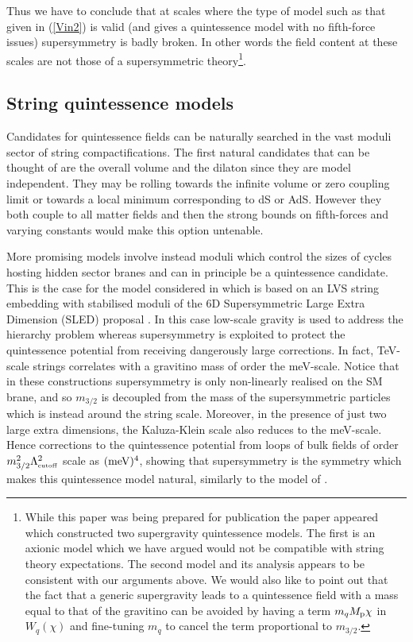 \documentclass[11pt,a4paper]{article}
\def\cutoff{{\scriptscriptstyle {\rm cutoff}}}
\begin{document}
\begin{itemize}
Thus we have to conclude that at scales where the type of model such as that given in (\ref{Vin2}) is valid (and gives a quintessence model with no fifth-force issues) supersymmetry is badly broken. In other words the field content at these scales are not those of a supersymmetric theory\footnote{While this paper was being prepared for publication the paper \cite{Chiang:2018jdg} appeared which constructed two supergravity quintessence models. The first is an axionic model which we have argued would not be compatible with string theory expectations. The second model and its analysis appears to be consistent with our arguments above. We would also like to point out that the fact that a generic supergravity leads to a quintessence field with a mass equal to that of the gravitino can be avoided by having a term $m_q M_{\rm p} \chi$ in $W_q(\chi)$ and fine-tuning $m_q$ to cancel the term proportional to $m_{3/2}$.}.



\subsection{String quintessence models}
\label{sec:StringQuintessenceModels}

Candidates for quintessence fields can be naturally searched in the vast moduli sector of string compactifications. The first natural candidates that can be thought of are the overall volume and the dilaton since they are model independent. They may be rolling towards the infinite volume or zero coupling limit or towards a local minimum corresponding to dS or AdS. However they both couple to all matter fields and then the strong bounds on fifth-forces and varying constants would make this option untenable.

More promising models involve instead moduli which control the sizes of cycles hosting hidden sector branes and can in principle be a quintessence candidate. This is the case for the model considered in \cite{Cicoli:2012tz} which is based on an LVS string embedding with stabilised moduli \cite{Cicoli:2011yy} of the 6D Supersymmetric Large Extra Dimension (SLED) proposal \cite{Aghababaie:2003wz}. In this case low-scale gravity is used to address the hierarchy problem whereas supersymmetry is exploited to protect the quintessence potential from receiving dangerously large corrections. In fact, TeV-scale strings correlates with a gravitino mass of order the meV-scale. Notice that in these constructions supersymmetry is only non-linearly realised on the SM brane, and so $m_{3/2}$ is decoupled from the mass of the supersymmetric particles which is instead around the string scale. Moreover, in the presence of just two large extra dimensions, the Kaluza-Klein scale also reduces to the meV-scale. Hence corrections to the quintessence potential from loops of bulk fields of order $m_{3/2}^2 \Lambda_\cutoff^2$ scale as $({\rm meV})^4$, showing that supersymmetry is the symmetry which makes this quintessence model natural, similarly to the model of \cite{Albrecht:2001xt}. 


\end{itemize}
\end{document}
